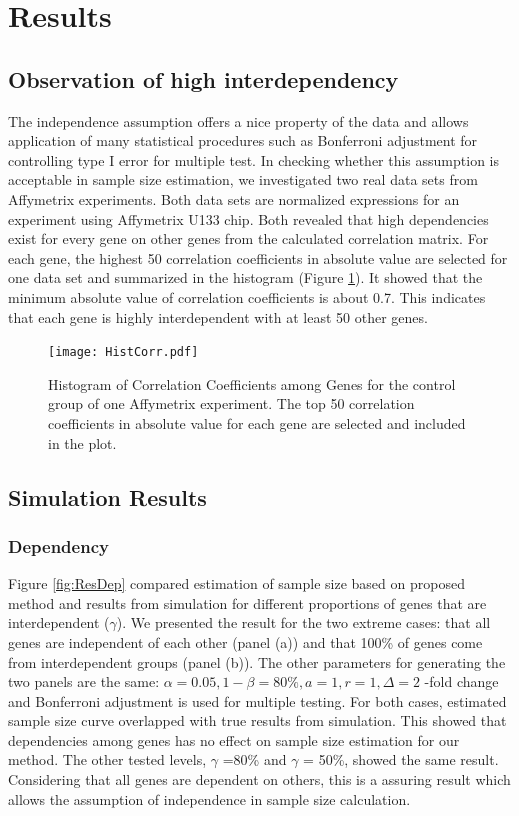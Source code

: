 \documentclass{bioinfo}
\begin{document}
\section{Results}

\subsection{Observation of high interdependency}
The independence assumption offers a nice property of the data and
allows application of many statistical procedures such as
Bonferroni adjustment for controlling type I error for multiple
test. In checking whether this assumption is acceptable in sample
size estimation, we investigated two real data sets from
Affymetrix experiments. Both data sets are normalized expressions
for an experiment using Affymetrix U133 chip. Both revealed that
high dependencies exist for every gene on other genes from the
calculated correlation matrix. For each gene, the highest 50
correlation coefficients in absolute value are selected for one
data set and summarized in the histogram (Figure
\ref{fig:HistCorr}). It showed that the minimum absolute value of
correlation coefficients is about 0.7. This indicates that each
gene is highly interdependent with at least 50 other genes.

\begin{figure}[h]
  \centerline{\texttt{[image: HistCorr.pdf]}}
  \caption[Histogram of Correlation Coefficients among Genes]
  {Histogram of Correlation Coefficients among Genes for the control group of one Affymetrix
    experiment. The top 50 correlation coefficients in absolute value for each gene are selected and included in the plot.}
  \label{fig:HistCorr}
\end{figure}

\subsection{Simulation Results}

\subsubsection{Dependency}

Figure \ref{fig:ResDep} compared estimation of sample size based
on proposed method and results from simulation for different
proportions of genes that are interdependent ($\gamma$). We
presented the result for the two extreme cases: that all genes are
independent of each other (panel (a)) and that 100\% of genes come
from interdependent groups (panel (b)). The other parameters for
generating the two panels are the same: $\alpha = 0.05, 1 - \beta
= 80\%, a = 1, r = 1, \Delta = 2$ -fold change and Bonferroni
adjustment is used for multiple testing. For both cases, estimated
sample size curve overlapped with true results from simulation.
This showed that dependencies among genes has no effect on sample
size estimation for our method. The other tested levels, $\gamma$
=80\% and $\gamma$ = 50\%, showed the same result. Considering
that all genes are dependent on others, this is a assuring result
which allows the assumption of independence in sample size
calculation.
\end{document}
